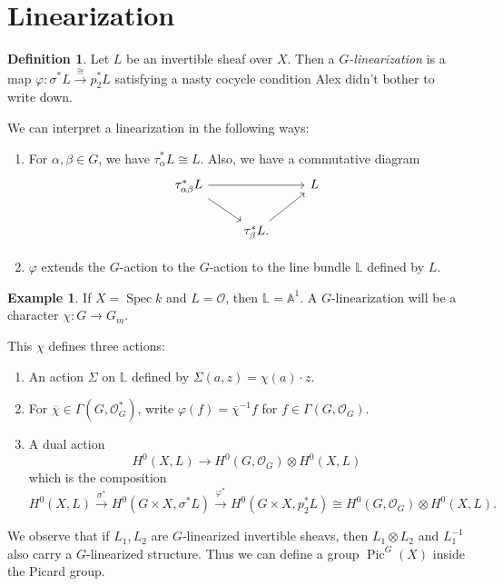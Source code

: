 \documentclass[leqno, openany]{memoir}
\theoremstyle{definition}
\newtheorem{defn}[thm]{Definition}
\newtheorem{exm}[thm]{Example}
\theoremstyle{remark}
\theoremstyle{plain}
\theoremstyle{definition}
\theoremstyle{remark}
\newcommand{\A}{\mathbb{A}}
\newcommand{\mc}[1]{\mathcal{#1}}
\newcommand{\ol}[1]{\overline{#1}}
\DeclareMathOperator{\Pic}{Pic}
\DeclareMathOperator{\Spec}{Spec}
\begin{document}
\section{Linearization}%

\begin{defn} Let $L$ be an invertible sheaf over $X$. Then a
\textit{$G$-linearization} is a map $\varphi \colon \sigma^* L
\xrightarrow{\cong} p_2^* L$ satisfying a nasty cocycle condition Alex didn't
bother to write down.  \end{defn}

We can interpret a linearization in the following ways: \begin{enumerate} \item
    For $\alpha, \beta \in G$, we have $\tau_{\alpha}^* L \cong L$. Also, we
    have a commutative diagram \begin{equation*} \begin{tikzcd} \tau_{\alpha
        \beta}^*L \arrow{rr} \arrow{dr} && L \\ & \tau_{\beta}^* L. \arrow{ur}
\end{tikzcd} \end{equation*} \item $\varphi$ extends the $G$-action to the
$G$-action to the line bundle $\mathbb{L}$ defined by $L$.  \end{enumerate}

\begin{exm} If $X = \Spec k$ and $L = \mc{O}$, then $\mathbb{L} = \A^1$. A
$G$-linearization will be a character $\chi \colon G \to G_m$.  \end{exm}

This $\chi$ defines three actions: \begin{enumerate} \item An action $\Sigma$
    on $\mathbb{L}$ defined by $\Sigma(a,z) = \chi(a) \cdot z$.  \item For
    $\ol{\chi} \in \Gamma(G, \mc{O}_G^*)$, write $\varphi(f) = \ol{\chi}^{-1}
    f$ for $f \in \Gamma(G, \mc{O}_G)$.  \item A dual action \[ H^0(X,L) \to
        H^0(G, \mc{O}_G) \otimes H^0(X,L) \] which is the composition \[
    H^0(X,L) \xrightarrow{\sigma^*} H^0(G \times X, \sigma^* L)
\xrightarrow{\varphi^*} H^0(G \times X, p_2^* L) \cong H^0(G, \mc{O}_G) \otimes
H^0(X,L). \] \end{enumerate}

We observe that if $L_1, L_2$ are $G$-linearized invertible sheavs, then $L_1
\otimes L_2$ and $L_1^{-1}$ also carry a $G$-linearized structure. Thus we can
define a group $\Pic^G(X)$ inside the Picard group.
\end{document}
